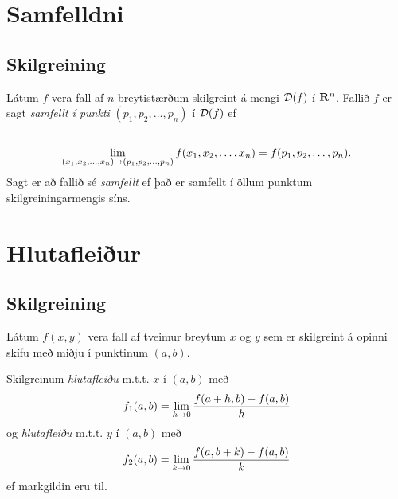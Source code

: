 \documentclass[a4paper,10pt,icelandic]{sphinxmanual}
\begin{document}

\section{Samfelldni}
\label{Kafli2:index-8}\label{Kafli2:samfelldni}

\subsection{Skilgreining}
\label{Kafli2:id8}
Látum \(f\) vera fall af \(n\) breytistærðum skilgreint á mengi
\({\cal D}(f)\) í \(\mbox{${\bf R}^n$}\). Fallið \(f\) er
sagt \emph{samfellt í punkti} \((p_1,p_2,\ldots,p_n)\) í
\({\cal D}(f)\) ef
\begin{gather}
\begin{split}\displaystyle\end{split}\notag\\\begin{split}\lim_{(x_1,x_2,\ldots,x_n)\rightarrow (p_1,p_2,\ldots,p_n)}
f(x_1,x_2,\ldots,x_n)=f(p_1,p_2,\ldots,p_n).\end{split}\notag
\end{gather}
Sagt er að fallið sé \textit{samfellt} ef það er samfellt í öllum punktum
skilgreiningarmengis síns.


\section{Hlutafleiður}
\label{Kafli2:id9}

\subsection{Skilgreining}
\label{Kafli2:id10}\label{Kafli2:index-9}
Látum \(f(x,y)\) vera fall af tveimur breytum \(x\) og \(y\)
sem er skilgreint á opinni skífu með miðju í punktinum \((a,b)\).

Skilgreinum \textit{hlutafleiðu} m.t.t. \(x\) í \((a,b)\) með
\begin{gather}
\begin{split}\displaystyle f_1(a,b)=\lim_{h\rightarrow 0}\frac{f(a+h,b)-f(a,b)}{h}\end{split}\notag
\end{gather}
og \textit{hlutafleiðu} m.t.t. \(y\) í \((a,b)\) með
\begin{gather}
\begin{split}\displaystyle f_2(a,b)=\lim_{k\rightarrow 0}\frac{f(a,b+k)-f(a,b)}{k}\end{split}\notag
\end{gather}
ef markgildin eru til.
\end{document}
